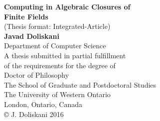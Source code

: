 \thispagestyle{empty}
\vspace*{1.5in}
\begin{center}
	\LARGE
	\textbf{Computing in Algebraic Closures of \\ Finite Fields} \\
	\normalsize
	\bigskip
	(Thesis format:  Integrated-Article)\\
	\smallskip
	\textbf{Javad Doliskani}\\
	\vspace*{1in}
	Department of Computer Science\\
	\vspace*{0.3in}
	A thesis submitted in partial fulfillment\\
	of the requirements for the degree of\\
	Doctor of Philosophy\\
	\vspace*{0.3in}
	The School of Graduate and Postdoctoral Studies\\
	The University of Western Ontario\\
	London, Ontario, Canada\\
	\vfill
	\copyright \hspace*{0.07in} J. Doliskani 2016  \\
\end{center}
